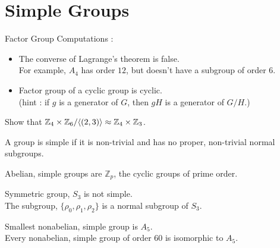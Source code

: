 \section{Simple Groups}
\begin{remark}Factor Group Computations :
\begin{itemize}
	\item The converse of Lagrange's theorem is false.\\
	For example, $A_4$ has order $12$, but doesn't have a subgroup of order $6$.
	\item Factor group of a cyclic group is cyclic.\\
	(hint : if $g$ is a generator of $G$, then $gH$ is a generator of $G/H$.)
\end{itemize}
\end{remark}

\begin{question}
	Show that $\mathbb{Z}_4 \times \mathbb{Z}_6 / \langle (2,3)\rangle\approx \mathbb{Z}_4 \times \mathbb{Z}_3$.
\end{question}

\begin{definition}
	A group is simple if it is non-trivial and has no proper, non-trivial normal subgroups.
\end{definition}

\begin{remark}
	Abelian, simple groups are $\mathbb{Z}_p$, the cyclic groups of prime order.
\end{remark}

\begin{remark}
	Symmetric group, $S_3$ is not simple.\\
	The subgroup, $\{ \rho_0,\rho_1,\rho_2\}$ is a normal subgroup of $S_3$.
\end{remark}

\begin{remark}
	Smallest nonabelian, simple group is $A_5$.\\
	Every nonabelian, simple group of order $60$ is isomorphic to $A_5$.
\end{remark}


